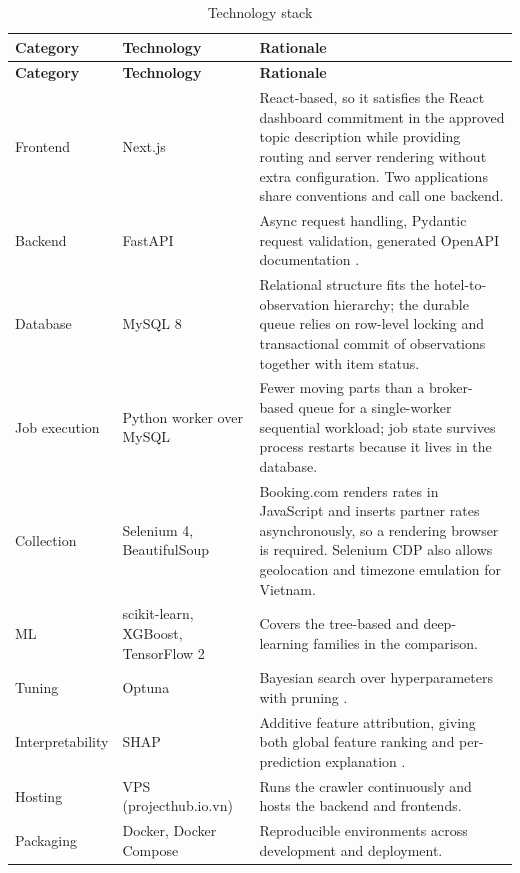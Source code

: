 \begin{longtable}{|p{3.4cm}|p{3.6cm}|p{7.4cm}|}
\caption{Technology stack}
\label{tab:tech_stack} \\
\hline
\textbf{Category} & \textbf{Technology} & \textbf{Rationale} \\
\hline
\endfirsthead
\hline
\textbf{Category} & \textbf{Technology} & \textbf{Rationale} \\
\hline
\endhead
\hline
\endfoot
\hline
\endlastfoot
Frontend & Next.js & React-based, so it satisfies the React dashboard commitment in the approved topic description while providing routing and server rendering without extra configuration. Two applications share conventions and call one backend. \\
\hline
Backend & FastAPI & Async request handling, Pydantic request validation, generated OpenAPI documentation \cite{fastapi2024}. \\
\hline
Database & MySQL 8 & Relational structure fits the hotel-to-observation hierarchy; the durable queue relies on row-level locking and transactional commit of observations together with item status. \\
\hline
Job execution & Python worker over MySQL & Fewer moving parts than a broker-based queue for a single-worker sequential workload; job state survives process restarts because it lives in the database. \\
\hline
Collection & Selenium 4, BeautifulSoup & Booking.com renders rates in JavaScript and inserts partner rates asynchronously, so a rendering browser is required. Selenium CDP also allows geolocation and timezone emulation for Vietnam. \\
\hline
ML & scikit-learn, XGBoost, TensorFlow 2 & Covers the tree-based and deep-learning families in the comparison. \\
\hline
Tuning & Optuna & Bayesian search over hyperparameters with pruning \cite{optuna2019}. \\
\hline
Interpretability & SHAP & Additive feature attribution, giving both global feature ranking and per-prediction explanation \cite{lundberg2017}. \\
\hline
Hosting & VPS (projecthub.io.vn) & Runs the crawler continuously and hosts the backend and frontends. \\
\hline
Packaging & Docker, Docker Compose & Reproducible environments across development and deployment. \\
\hline
\end{longtable}

